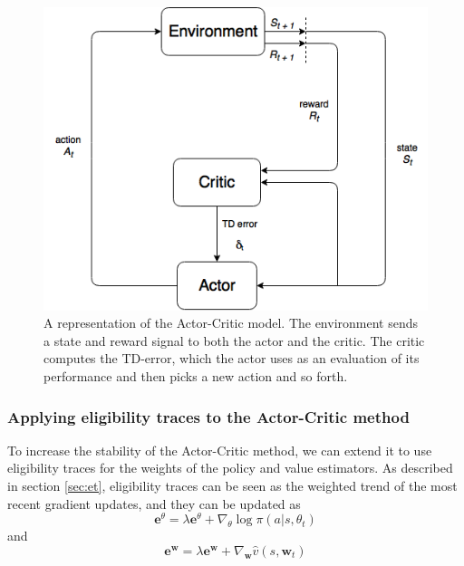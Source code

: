 \documentclass[11pt]{article}
\begin{document}
\begin{figure}[!h]
    \centering
    \includegraphics[scale = 0.5]{include/ActorCriticDiagram.png}
    \caption{A representation of the Actor-Critic model.
        The environment sends a state and reward signal to both the actor and the critic.
        The critic computes the TD-error, which the actor uses as an evaluation of its performance
        and then picks a new action and so forth.}
    \label{fig:actor-critic}
\end{figure}


\subsubsection{Applying eligibility traces to the Actor-Critic method}\label{sec:actor_critic_el}

To increase the stability of the Actor-Critic method, we can extend it to use eligibility traces
for the weights of the policy and value estimators.
As described in section \ref{sec:et}, eligibility traces can be seen as the weighted trend
of the most recent gradient updates, and they can be updated as
\begin{equation}
    \mathbf{e}^{\theta} = \lambda \mathbf{e}^{\theta} + \nabla_\theta \log\pi(a|s,\theta_t)
\end{equation}
and
\begin{equation}
    \mathbf{e}^{\mathbf{w}} = \lambda \mathbf{e}^{\mathbf{w}} + \nabla_\mathbf{w} \hat{v}(s, \mathbf{w}_t)
\end{equation}
\end{document}
